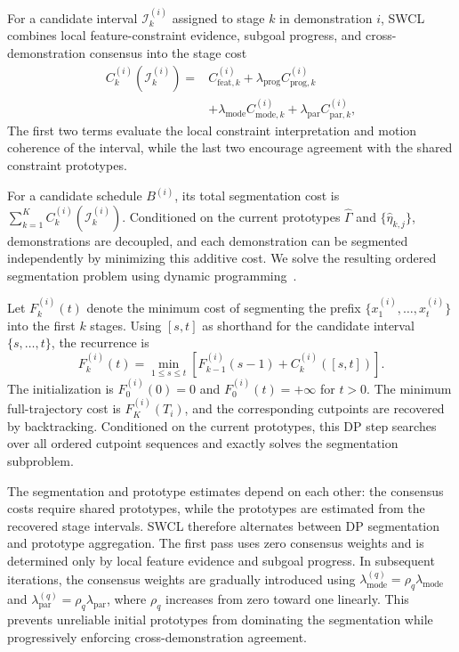 \documentclass[lettersize,journal]{IEEEtran}
\begin{document}
For a candidate interval $\mathcal{I}_k^{(i)}$ assigned to stage $k$ in demonstration $i$, SWCL combines local feature-constraint evidence, subgoal progress, and cross-demonstration consensus into the stage cost
\begin{equation}
\begin{aligned}
C_k^{(i)}(\mathcal{I}_k^{(i)})
={}&
C_{\mathrm{feat},k}^{(i)}
+
\lambda_{\mathrm{prog}}C_{\mathrm{prog},k}^{(i)} \\
&+
\lambda_{\mathrm{mode}}C_{\mathrm{mode},k}^{(i)}
+
\lambda_{\mathrm{par}}C_{\mathrm{par},k}^{(i)},
\end{aligned}
\label{eq:full_stage_cost}
\end{equation}
The first two terms evaluate the local constraint interpretation and motion coherence of the interval, while the last two encourage agreement with the shared constraint prototypes.

For a candidate schedule $B^{(i)}$, its total segmentation cost is $\sum_{k=1}^{K}C_k^{(i)}(\mathcal{I}_k^{(i)})$. Conditioned on the current prototypes $\hat{\Gamma}$ and $\{\hat{\eta}_{k,j}\}$, demonstrations are decoupled, and each demonstration can be segmented independently by minimizing this additive cost. We solve the resulting ordered segmentation problem using dynamic programming~\cite{truong2020selective,aminikhanghahi2017survey}.

Let $F_k^{(i)}(t)$ denote the minimum cost of segmenting the prefix $\{x_1^{(i)},\dots,x_t^{(i)}\}$ into the first $k$ stages. Using $[s,t]$ as shorthand for the candidate interval $\{s,\dots,t\}$, the recurrence is
\begin{equation}
F_k^{(i)}(t)
=
\min_{1\leq s\leq t}
\left[
F_{k-1}^{(i)}(s-1)
+
C_k^{(i)}([s,t])
\right].
\label{eq:dp_recurrence}
\end{equation}
The initialization is $F_0^{(i)}(0)=0$ and $F_0^{(i)}(t)=+\infty$ for $t>0$. The minimum full-trajectory cost is $F_K^{(i)}(T_i)$, and the corresponding cutpoints are recovered by backtracking. Conditioned on the current prototypes, this DP step searches over all ordered cutpoint sequences and exactly solves the segmentation subproblem.

The segmentation and prototype estimates depend on each other: the consensus costs require shared prototypes, while the prototypes are estimated from the recovered stage intervals. SWCL therefore alternates between DP segmentation and prototype aggregation. The first pass uses zero consensus weights and is determined only by local feature evidence and subgoal progress. In subsequent iterations, the consensus weights are gradually introduced using $\lambda_{\mathrm{mode}}^{(q)}=\rho_q\lambda_{\mathrm{mode}}$ and $\lambda_{\mathrm{par}}^{(q)}=\rho_q\lambda_{\mathrm{par}}$, where $\rho_q$ increases from zero toward one linearly. This prevents unreliable initial prototypes from dominating the segmentation while progressively enforcing cross-demonstration agreement.
\end{document}
